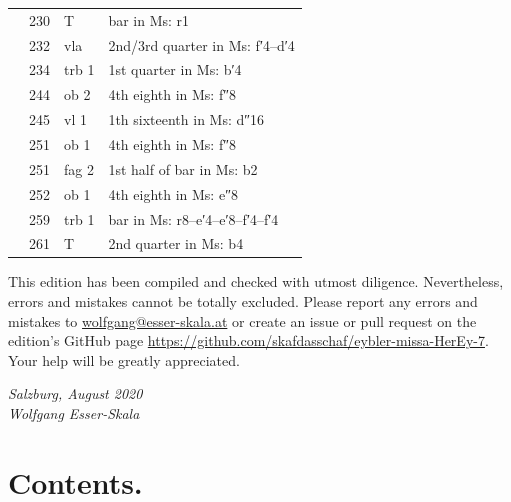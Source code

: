 \documentclass[parskip=full]{scrreprt}
\newif\iftemplate\templatetrue
\begin{document}
\begin{longtable}{lll L{10cm}}
	  & 230 & T        & bar in Ms: r1 \\
	  & 232 & vla      & 2nd/3rd quarter in Ms: f′4–d′4 \\
	  & 234 & trb 1    & 1st quarter in Ms: b′4 \\
	  & 244 & ob 2     & 4th eighth in Ms: f″8 \\
	  & 245 & vl 1     & 1th sixteenth in Ms: d″16 \\
	  & 251 & ob 1     & 4th eighth in Ms: f″8 \\
	  & 251 & fag 2    & 1st half of bar in Ms: b2 \\
	  & 252 & ob 1     & 4th eighth in Ms: e″8 \\
	  & 259 & trb 1    & bar in Ms: r8–e′4–e′8–f′4–f′4 \\
	  & 261 & T        & 2nd quarter in Ms: b4 \\
	\bottomrule
\end{longtable}


This edition has been compiled and checked with utmost diligence. Nevertheless, errors and mistakes cannot be totally excluded. Please report any errors and mistakes to \url{wolfgang@esser-skala.at} or create an issue or pull request on the edition’s GitHub page \url{https://github.com/skafdasschaf/eybler-missa-HerEy-7}. Your help will be greatly appreciated.

\bigskip
\textit{Salzburg, August 2020\\
Wolfgang Esser-Skala}

\cleardoublepage
\chapter*{Contents.}


\cleardoublepage
\fi

\iftemplate

\fi
\end{document}
